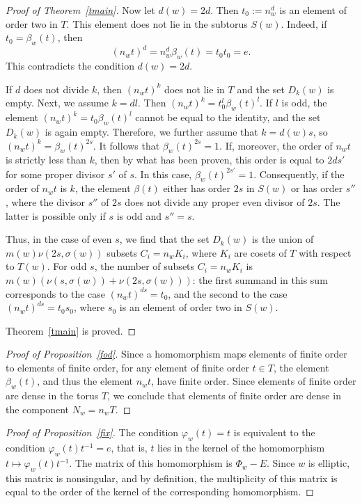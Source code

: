 \documentclass[a4paper,12pt]{amsart}
\theoremstyle{plain}
\theoremstyle{definition}
\begin{document}
\begin{proof}[Proof of Theorem~\ref{tmain}]
Now let $d(w)=2d$. Then $t_0:=n_w^d$ is an element of order two in $T$. This element does not lie in the subtorus $S(w)$. Indeed, if $t_0=\beta_w(t)$, then
$$
(n_wt)^d=n_w^d\beta_w(t)=t_0t_0=e.
$$
This contradicts the condition $d(w)=2d$.

If $d$ does not divide $k$, then $(n_wt)^k$ does not lie in $T$ and the set $D_k(w)$ is empty. Next, we assume $k=dl$. Then $(n_wt)^k=t_0^l\beta_w(t)^l$. If $l$ is odd, the element $(n_wt)^k=t_0\beta_w(t)^l$ cannot be equal to the identity, and the set $D_k(w)$ is again empty. Therefore, we further assume that $k=d(w)s$, so $(n_wt)^k=\beta_w(t)^{2s}$.
It follows that $\beta_w(t)^{2s}=1$. If, moreover, the order of $n_wt$ is strictly less than $k$, then by what has been proven, this order is equal to $2ds'$ for some proper divisor $s'$ of $s$. In this case, $\beta_w(t)^{2s'}=1$. Consequently, if the order of $n_wt$ is $k$, the element $\beta(t)$ either has order $2s$ in $S(w)$ or has order $s''$, where the divisor $s''$ of $2s$ does not divide any proper even divisor of $2s$. The latter is possible only if $s$ is odd and $s''=s$.

Thus, in the case of even $s$, we find that the set $D_k(w)$ is the union of $m(w)\nu(2s,\sigma(w))$ subsets $C_i=n_wK_i$, where $K_i$ are cosets of $T$ with respect to $T(w)$. For odd $s$, the number of subsets $C_i=n_wK_i$ is ${m(w)(\nu(s,\sigma(w))+\nu(2s,\sigma(w)))}$: the first summand in this sum corresponds to the case $(n_wt)^{ds}=t_0$, and the second to the case $(n_wt)^{ds}=t_0s_0$, where $s_0$ is an element of order two in $S(w)$.

\smallskip

Theorem~\ref{tmain} is proved.
\end{proof}

\begin{proof}[Proof of Proposition~\ref{fod}]
Since a homomorphism maps elements of finite order to elements of finite order, for any element of finite order $t\in T$, the element $\beta_w(t)$, and thus the element $n_wt$, have finite order. Since elements of finite order are dense in the torus $T$, we conclude that elements of finite order are dense in the component $N_w=n_wT$.
\end{proof}

\begin{proof}[Proof of Proposition~\ref{fix}]
The condition $\varphi_w(t)=t$ is equivalent to the condition ${\varphi_w(t)t^{-1}=e}$, that is, $t$ lies in the kernel of the homomorphism $t\mapsto \varphi_w(t)t^{-1}$. The matrix of this homomorphism is $\Phi_w-E$. Since $w$ is elliptic, this matrix is nonsingular, and by definition, the multiplicity of this matrix is equal to the order of the kernel of the corresponding homomorphism.
\end{proof}
\end{document}
